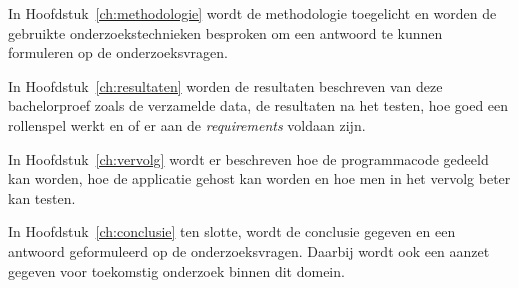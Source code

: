 In Hoofdstuk~\ref{ch:methodologie} wordt de methodologie toegelicht en worden de gebruikte onderzoekstechnieken besproken om een antwoord te kunnen formuleren op de onderzoeksvragen.

In Hoofdstuk~\ref{ch:resultaten} worden de resultaten beschreven van deze bachelorproef zoals de verzamelde data, de resultaten na het testen, hoe goed een rollenspel werkt en of er aan de \textit{requirements} voldaan zijn.

In Hoofdstuk~\ref{ch:vervolg} wordt er beschreven hoe de programmacode gedeeld kan worden, hoe de applicatie gehost kan worden en hoe men in het vervolg beter kan testen.

In Hoofdstuk~\ref{ch:conclusie} ten slotte, wordt de conclusie gegeven en een antwoord geformuleerd op de onderzoeksvragen. Daarbij wordt ook een aanzet gegeven voor toekomstig onderzoek binnen dit domein.